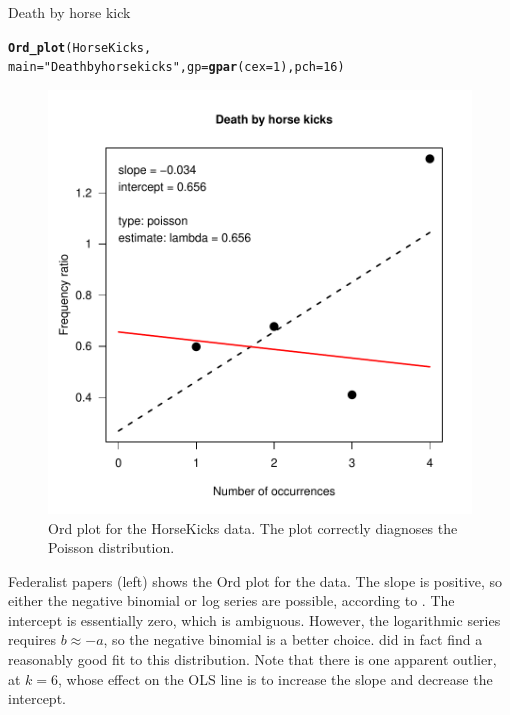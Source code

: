 \documentclass[11pt]{book}\usepackage[]{graphicx}\usepackage[]{color}
\makeatletter
\newcommand{\hlnum}[1]{\textcolor[rgb]{0.686,0.059,0.569}{#1}}%
\newcommand{\hlstr}[1]{\textcolor[rgb]{0.192,0.494,0.8}{#1}}%
\newcommand{\hlstd}[1]{\textcolor[rgb]{0.345,0.345,0.345}{#1}}%
\newcommand{\hlkwc}[1]{\textcolor[rgb]{0.333,0.667,0.333}{#1}}%
\newcommand{\hlkwd}[1]{\textcolor[rgb]{0.737,0.353,0.396}{\textbf{#1}}}%
\newenvironment{kframe}{%
 \def\at@end@of@kframe{}%
 \ifinner\ifhmode%
  \def\at@end@of@kframe{\end{minipage}}%
  \begin{minipage}{\columnwidth}%
 \fi\fi%
 \def\FrameCommand##1{\hskip\@totalleftmargin \hskip-\fboxsep
 \colorbox{shadecolor}{##1}\hskip-\fboxsep
     \hskip-\linewidth \hskip-\@totalleftmargin \hskip\columnwidth}%
 \MakeFramed {\advance\hsize-\width
   \@totalleftmargin\z@ \linewidth\hsize
   \@setminipage}}%
 {\par\unskip\endMakeFramed%
 \at@end@of@kframe}
\newenvironment{knitrout}{}{} %
\renewenvironment{knitrout}{\small\renewcommand{\baselinestretch}{.85}}{} %
\makeatother
\begin{document}
\begin{Example}[horskick3]{Death by horse kick}
\begin{knitrout}
\color{fgcolor}\begin{kframe}
\begin{alltt}
\hlkwd{Ord_plot}\hlstd{(HorseKicks,}
         \hlkwc{main} \hlstd{=} \hlstr{"Death by horse kicks"}\hlstd{,} \hlkwc{gp}\hlstd{=}\hlkwd{gpar}\hlstd{(}\hlkwc{cex}\hlstd{=}\hlnum{1}\hlstd{),} \hlkwc{pch}\hlstd{=}\hlnum{16}\hlstd{)}
\end{alltt}
\end{kframe}\begin{figure}[htbp]


\centerline{\includegraphics[width=.5\textwidth]{ch03/fig/ordplot2} }

\caption[Ord plot for the HorseKicks data]{Ord plot for the HorseKicks data. The plot correctly diagnoses the Poisson distribution.\label{fig:ordplot2}}
\end{figure}


\end{knitrout}

\end{Example}

\begin{Example}[madison3]{Federalist papers}
 (left) shows the Ord plot for the  data.
The slope is positive, so either the
negative binomial or log series are possible, according to .
The intercept is
essentially zero, which is ambiguous.  However, the logarithmic
series requires \(b \approx  - a\), so the negative binomial is a
better choice.  \citet{MostellerWallace:63,MostellerWallace:84} did in fact find a reasonably
good fit to this distribution. Note that there is one apparent outlier,
at $k=6$, whose effect on the OLS line is to increase the slope and decrease
the intercept.
\end{Example}
\end{document}
